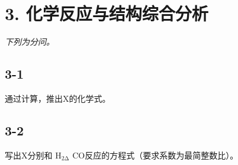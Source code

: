 \section*{3. 化学反应与结构综合分析}
\textit{下列为分问。}

\subsection*{3-1}
通过计算，推出X的化学式。

\subsection*{3-2}
写出X分别和 $\mathrm { H } _ { 2 \mathrm { \Delta } }$ CO反应的⽅程式（要求系数为最简整数⽐）。
